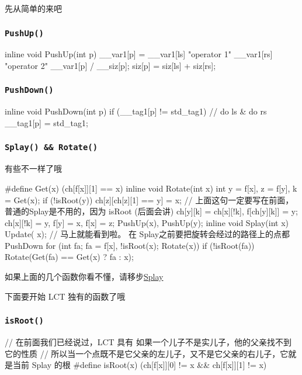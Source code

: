 先从简单的来吧

\subsubsection{\texttt{PushUp()}}

\begin{cppcode}
inline void PushUp(int p) {
  __var1[p] =
      __var1[ls] "operator 1" __var1[rs] "operator 2" __var1[p] / __siz[p];
  siz[p] = siz[ls] + siz[rs];
}
\end{cppcode}

\subsubsection{\texttt{PushDown()}}

\begin{cppcode}
inline void PushDown(int p) {
  if (__tag1[p] != std_tag1) {
    // do ls & do rs
    __tag1[p] = std_tag1;
  }
}
\end{cppcode}

\subsubsection{\texttt{Splay() && Rotate()}}

有些不一样了哦

\begin{cppcode}
#define Get(x) (ch[f[x]][1] == x)
inline void Rotate(int x) {
  int y = f[x], z = f[y], k = Get(x);
  if (!isRoot(y)) ch[z][ch[z][1] == y] = x;
  // 上面这句一定要写在前面，普通的Splay是不用的，因为 isRoot  (后面会讲)
  ch[y][k] = ch[x][!k], f[ch[y][k]] = y;
  ch[x][!k] = y, f[y] = x, f[x] = z;
  PushUp(x), PushUp(y);
}
inline void Splay(int x) {
  Update(
      x);  // 马上就能看到啦。 在 Splay之前要把旋转会经过的路径上的点都PushDown
  for (int fa; fa = f[x], !isRoot(x); Rotate(x)) {
    if (!isRoot(fa)) Rotate(Get(fa) == Get(x) ? fa : x);
  }
}
\end{cppcode}

如果上面的几个函数你看不懂，请移步\href{/ds/splay/}{Splay} 

下面要开始 LCT 独有的函数了哦

\subsubsection{\texttt{isRoot()}}

\begin{cppcode}
// 在前面我们已经说过，LCT 具有 如果一个儿子不是实儿子，他的父亲找不到它的性质
// 所以当一个点既不是它父亲的左儿子，又不是它父亲的右儿子，它就是当前 Splay 的根
#define isRoot(x) (ch[f[x]][0] != x && ch[f[x]][1] != x)
\end{cppcode}

